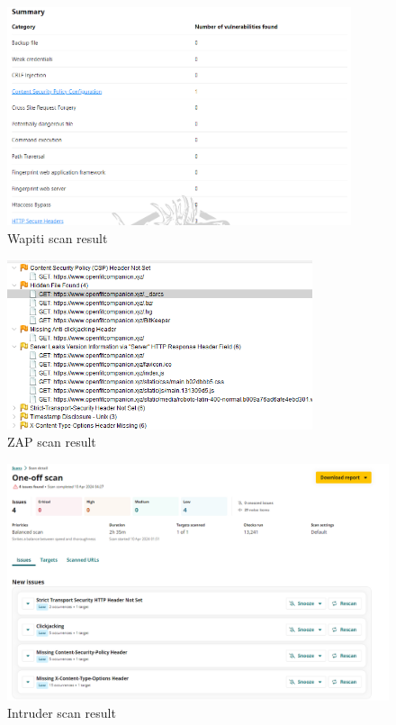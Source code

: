 \begin{figure}
    
    \centering
    \includegraphics[width=0.9\textwidth,keepaspectratio]{../images/Wapiti.png}
    \caption{Wapiti scan result}
    \label{fig:wapiti}
    
\end{figure}
\begin{figure}
    
    \centering
    \includegraphics[width=0.8\textwidth,keepaspectratio]{../images/ZapResults.png}
    \caption{ZAP scan result}
    \label{fig:zap}
    
\end{figure}
\begin{figure}
    
    \centering
    \includegraphics[width=1\textwidth,keepaspectratio]{../images/IntruderResults.png}
    \caption{Intruder scan result}
    \label{fig:intruder}
    
\end{figure}
